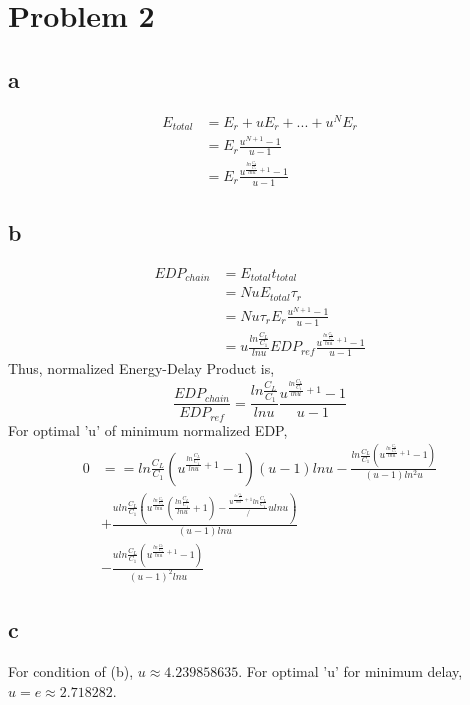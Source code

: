 \documentclass[a4paper,10pt]{article}
\begin{document}
\section*{Problem 2}
\subsection*{a}
\begin{equation}
\begin{split}
 E_{total} &= E_r + uE_r + ... + u^N E_r\\
 &=E_r \frac{u^{N+1} - 1}{u-1}\\
 &= E_r \frac{u^{\frac{ln\frac{C_L}{C_1}}{ln u} + 1} - 1}{u-1}
\end{split}
\end{equation}
\subsection*{b}
\begin{equation}
\begin{split}
  EDP_{chain} &= E_{total} t_{total}\\
  &=NuE_{total}\tau_r\\
  &=Nu\tau_r E_r \frac{u^{N+1} - 1}{u-1}\\
  &=u\frac{ln\frac{C_L}{C_1}}{ln u} EDP_{ref}\frac{u^{\frac{ln\frac{C_L}{C_1}}{ln u} + 1} - 1}{u-1}
\end{split}
\end{equation}
Thus, normalized Energy-Delay Product is,
\begin{equation}
 \frac{EDP_{chain}}{EDP_{ref}} = \frac{ln\frac{C_L}{C_1}}{ln u}\frac{u^{\frac{ln\frac{C_L}{C_1}}{ln u} + 1} - 1}{u-1}
\end{equation}
For optimal 'u' of minimum normalized EDP,
\begin{equation}
\begin{split}
0&=={ln \frac{C_L}{C_1} (u^{\frac{ln\frac{C_L}{C_1}}{ln u} + 1} - 1)}{(u - 1)ln u} - \frac{ln\frac{C_L}{C_1} (u^{\frac{ln\frac{C_L}{C_1}}{ln u} + 1} - 1)}{(u-1)ln^2 u}\\
& + \frac{u ln\frac{C_L}{C_1}(u^{\frac{ln\frac{C_L}{C_1}}{ln u}}(\frac{ln\frac{C_L}{C_1}}{ln u} + 1) - \frac{u^{\frac{ln\frac{C_L}{C_1}}{ln u} + 1}ln\frac{C_L}{C_1}}/{u ln u})}{(u - 1)ln u}\\
& - \frac{u ln\frac{C_L}{C_1}(u^{\frac{ln\frac{C_L}{C_1}}{ln u} + 1} - 1)}{(u - 1)^2 ln u}
\end{split}
\end{equation}
\subsection*{c}
For condition of (b), \begin{math}u\approx 4.239858635\end{math}. For optimal 'u' for minimum delay, \begin{math}u=e\approx 2.718282\end{math}.
\end{document}
